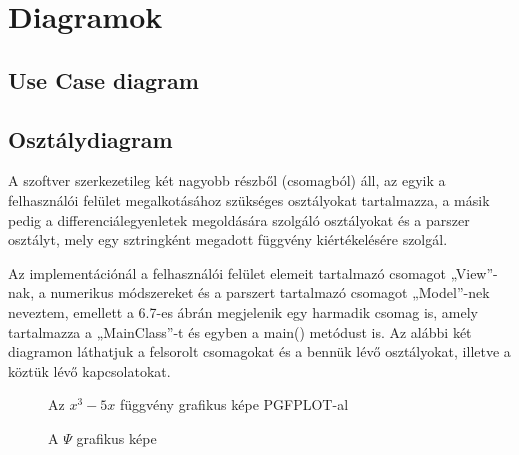 \pagebreak
\section {Diagramok}

\subsection{Use Case diagram}
\subsection{Osztálydiagram}
	A szoftver szerkezetileg két nagyobb részből (csomagból) áll, az egyik a felhasználói felület megalkotásához szükséges osztályokat tartalmazza, a másik pedig a differenciálegyenletek megoldására szolgáló osztályokat és a parszer osztályt, mely egy sztringként megadott függvény kiértékelésére szolgál.
	
	Az implementációnál a felhasználói felület elemeit tartalmazó csomagot „View”-nak, a numerikus módszereket és a parszert tartalmazó csomagot „Model”-nek neveztem, emellett a 6.7-es ábrán megjelenik egy harmadik csomag is, amely tartalmazza a „MainClass”-t és egyben a main() metódust is. Az alábbi két diagramon láthatjuk a felsorolt csomagokat és a bennük lévő osztályokat, illetve a köztük lévő kapcsolatokat.
	\pagebreak
	\begin{figure}
		\centering
\caption{Az $x^3-5x$ f\"uggv\'eny grafikus k\'epe PGFPLOT-al}
\end{figure}


\begin{figure}[h!]
	\centering
	\caption{A $\Psi$ grafikus k\'epe}
\end{figure}
\pagebreak
